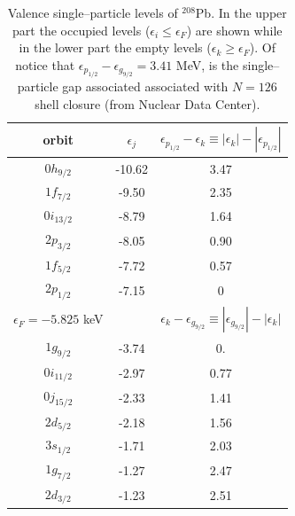 \begin{table}
\begin{tabular}{|c|c|c|}
\hline \rule[-2ex]{0pt}{5.5ex}   orbit& $\epsilon_j$  & $\epsilon_{p_{1/2}}-\epsilon_k\equiv|\epsilon_k|-|\epsilon_{p_{1/2}}|$  \\ 
\hline
$0h_{9/2}$&-10.62 &3.47\\
$1f_{7/2}$& -9.50&2.35\\
$0i_{13/2}$& -8.79&1.64\\
$2p_{3/2}$& -8.05&0.90\\
$1f_{5/2}$& -7.72&0.57\\
$2p_{1/2}$& -7.15&0\\
\hline \rule[-2ex]{0pt}{5.5ex}   $\epsilon_F=-5.825$ keV&   & $\epsilon_k-\epsilon_{g_{9/2}}\equiv|\epsilon_{g_{9/2}}|-|\epsilon_k|$  \\ 
\hline
$1g_{9/2}$&-3.74 &0.\\
$0i_{11/2}$& -2.97&0.77\\
$0j_{15/2}$& -2.33&1.41\\
$2d_{5/2}$& -2.18&1.56\\
$3s_{1/2}$& -1.71&2.03\\
$1g_{7/2}$& -1.27&2.47\\
$2d_{3/2}$& -1.23&2.51\\
\hline
\end{tabular}\caption{Valence single--particle levels of $^{208}$Pb. In the upper part the occupied levels ($\epsilon_i\leq\epsilon_F$) are shown while in the lower part the empty levels ($\epsilon_k\geq\epsilon_F$). Of notice that $\epsilon_{p_{1/2}}-\epsilon_{g_{9/2}}=3.41$ MeV, is the single--particle gap associated associated with $N=126$ shell closure (from Nuclear Data Center).}\label{tab1E1}
 \end{table}
 
